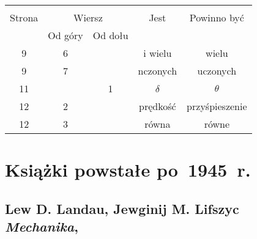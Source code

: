 \documentclass[a4paper,11pt]{article}
\numberwithin{equation}{section}
\begin{document}
\begin{center}

  \begin{tabular}{|c|c|c|c|c|}
    \hline
    & \multicolumn{2}{c|}{} & & \\
    Strona & \multicolumn{2}{c|}{Wiersz}
                            & Jest & Powinno być \\ \cline{2-3}
    & Od góry & Od dołu & & \\
    \hline
    9   &  6 & & i wielu & wielu \\
    9   &  7 & & nczonych & uczonych \\
    11  & &  1 & $\delta$ & $\theta$ \\
    12  &  2 & & prędkość & przyśpieszenie \\
    12  &  3 & & równa & równe \\
    \hline
  \end{tabular}

\end{center}

\VerSpaceTwo











\newpage

\section{Książki powstałe po~1945~r.}

\VerSpaceTwo



\subsection{ %
  Lew D. Landau, Jewginij M. Lifszyc \\
  \textit{Mechanika}, \cite{LandauLifszycMechanika2006}}

\vspace{0em}


\end{document}
